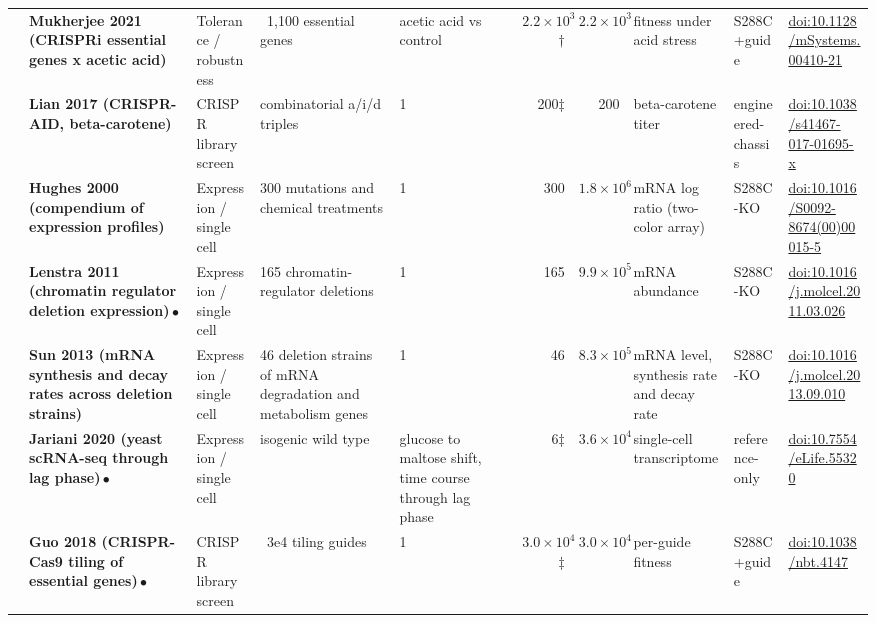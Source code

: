 \begin{landscape}
\begin{longtable}{@{}r@{\hspace{4pt}} L{42mm} L{21mm} L{26mm} L{20mm} r@{\hspace{5pt}} r@{\hspace{5pt}} L{30mm} L{23mm} L{34mm}@{}}
 & \textbf{Mukherjee 2021 (CRISPRi essential genes x acetic acid)} & Tolerance / robustness & ~1,100 essential genes & acetic acid vs control & $2.2\times 10^{3}$$\dagger$ & $2.2\times 10^{3}$ & fitness under acid stress & S288C+\allowbreak guide & \href{https://doi.org/10.1128/mSystems.00410-21}{doi:10.1128/\allowbreak mSystems.00410-21} \\
 & \textbf{Lian 2017 (CRISPR-AID, beta-carotene)} & CRISPR library screen & combinatorial a/i/d triples & 1 & 200$\ddagger$ & 200 & beta-carotene titer & engineered-\allowbreak chassis & \href{https://doi.org/10.1038/s41467-017-01695-x}{doi:10.1038/\allowbreak s41467-017-01695-x} \\
 & \textbf{Hughes 2000 (compendium of expression profiles)} & Expression / single cell & 300 mutations and chemical treatments & 1 & 300 & $1.8\times 10^{6}$ & mRNA log ratio (two-color array) & S288C-\allowbreak KO & \href{https://doi.org/10.1016/S0092-8674(00)00015-5}{doi:10.1016/\allowbreak S0092-8674(00)00015-5} \\
 & \textbf{Lenstra 2011 (chromatin regulator deletion expression)}\,$\bullet$ & Expression / single cell & 165 chromatin-regulator deletions & 1 & 165 & $9.9\times 10^{5}$ & mRNA abundance & S288C-\allowbreak KO & \href{https://doi.org/10.1016/j.molcel.2011.03.026}{doi:10.1016/\allowbreak j.molcel.2011.03.026} \\
 & \textbf{Sun 2013 (mRNA synthesis and decay rates across deletion strains)} & Expression / single cell & 46 deletion strains of mRNA degradation and metabolism genes & 1 & 46 & $8.3\times 10^{5}$ & mRNA level, synthesis rate and decay rate & S288C-\allowbreak KO & \href{https://doi.org/10.1016/j.molcel.2013.09.010}{doi:10.1016/\allowbreak j.molcel.2013.09.010} \\
 & \textbf{Jariani 2020 (yeast scRNA-seq through lag phase)}\,$\bullet$ & Expression / single cell & isogenic wild type & glucose to maltose shift, time course through lag phase & 6$\ddagger$ & $3.6\times 10^{4}$ & single-cell transcriptome & reference-\allowbreak only & \href{https://doi.org/10.7554/eLife.55320}{doi:10.7554/\allowbreak eLife.55320} \\
 & \textbf{Guo 2018 (CRISPR-Cas9 tiling of essential genes)}\,$\bullet$ & CRISPR library screen & ~3e4 tiling guides & 1 & $3.0\times 10^{4}$$\ddagger$ & $3.0\times 10^{4}$ & per-guide fitness & S288C+\allowbreak guide & \href{https://doi.org/10.1038/nbt.4147}{doi:10.1038/\allowbreak nbt.4147} \\

\end{longtable}
\end{landscape}
